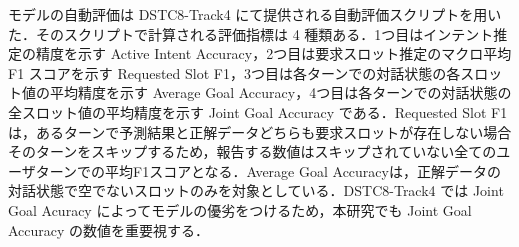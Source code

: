 モデルの自動評価は DSTC8-Track4 にて提供される自動評価スクリプトを用いた．そのスクリプトで計算される評価指標は 4 種類ある．1つ目はインテント推定の精度を示す Active Intent Accuracy，2つ目は要求スロット推定のマクロ平均 F1 スコアを示す Requested Slot F1，3つ目は各ターンでの対話状態の各スロット値の平均精度を示す Average Goal Accuracy，4つ目は各ターンでの対話状態の全スロット値の平均精度を示す Joint Goal Accuracy である．Requested Slot F1は，あるターンで予測結果と正解データどちらも要求スロットが存在しない場合そのターンをスキップするため，報告する数値はスキップされていない全てのユーザターンでの平均F1スコアとなる．Average Goal Accuracyは，正解データの対話状態で空でないスロットのみを対象としている．DSTC8-Track4 では Joint Goal Acuracy によってモデルの優劣をつけるため，本研究でも Joint Goal Accuracy の数値を重要視する．